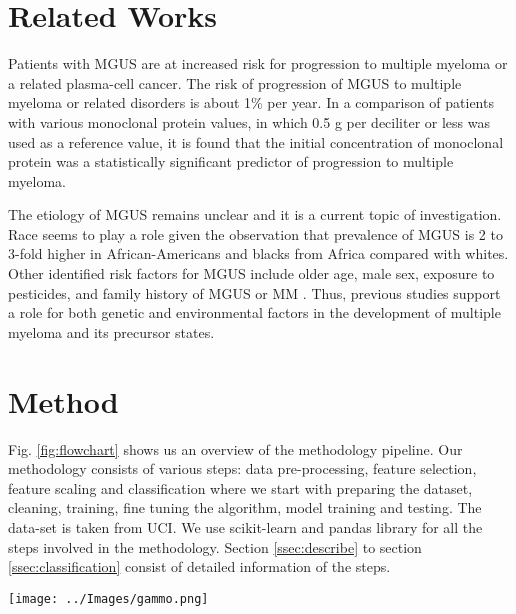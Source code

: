\documentclass[conference]{IEEEtran}
\begin{document}
\section{Related Works}
\par
Patients with MGUS are at increased risk for progression to multiple myeloma or a related plasma-cell cancer. The risk of progression of MGUS to multiple myeloma or related disorders is about 1\% per year. \cite{monoclonal1,monoclonal2} In a comparison of patients with various monoclonal protein values, in which 0.5 g per deciliter or less was used as a reference value, it is found that the initial concentration of monoclonal protein was a statistically significant predictor of progression to multiple myeloma.

\par

The etiology of MGUS remains unclear and it is a current topic of investigation. Race seems to play a role given the observation that prevalence of MGUS is 2 to 3-fold higher in African-Americans and blacks from Africa compared with whites. \cite{monoclonal6, monoclonal7} Other identified risk factors for MGUS include older age, male sex, exposure to pesticides, and family history of MGUS or MM \cite{monoclonal9,monoclonal10,monoclonal11}. Thus, previous studies support a role for both genetic and environmental factors in the development of multiple myeloma and its precursor states. \cite{monoclonal12}

\section{Method}                                                                     
Fig. \ref{fig:flowchart} shows us an overview of the methodology pipeline. Our methodology consists of various steps: data pre-processing, feature selection, feature scaling and classification where we start with preparing the dataset, cleaning, training, fine tuning the algorithm, model training and testing. The data-set is taken from UCI\cite{uci}. We use scikit-learn \cite{scikit} and pandas library for all the steps involved in the methodology. Section \ref{ssec:describe} to section \ref{ssec:classification} consist of detailed information of the steps.     
\par              
\begin{figure*}[t]
	\centering
	\texttt{[image: ../Images/gammo.png]}
	\caption{Methodology Pipeline Overview}
	\label{fig:flowchart}
\end{figure*}
\end{document}
